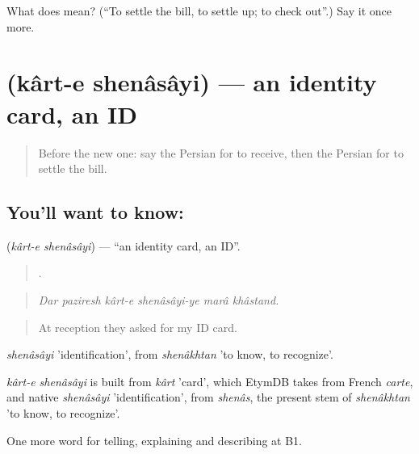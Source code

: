 \begin{tcolorbox}[breakable,colback=teal!4,colframe=teal!35!black,title={Before you move on}]
What does    mean? (\textquotedblleft{}To settle the bill, to settle up; to check out\textquotedblright{}.) Say it once more.
\end{tcolorbox}
\section[\texorpdfstring{\fa{کارت} \fa{شناسایی} (kârt-e shenâsâyi)}{کارت شناسایی (kârt-e shenâsâyi)}]{  (kârt-e shenâsâyi) — an identity card, an ID}

\label{lesson:FA-C438-kart-e-shenasayi}



\begin{quote}
Before the new one: say the Persian for to receive, then the Persian for to settle the bill.
\end{quote}

\subsection*{You'll want to know:  }
\textbf{ } (\emph{kârt-e shenâsâyi}) — \textquotedblleft{}an identity card, an ID\textquotedblright{}.

\begin{quote}
     .
\end{quote}

\begin{quote}
\emph{Dar paziresh kârt-e shenâsâyi-ye marâ khâstand.}
\end{quote}

\begin{quote}
At reception they asked for my ID card.
\end{quote}

\emph{shenâsâyi} 'identification', from \emph{shenâkhtan} 'to know, to recognize'.

\begin{cousinweb}
\emph{kârt-e shenâsâyi} is built from \emph{kârt} 'card', which EtymDB takes from French \emph{carte}, and native \emph{shenâsâyi} 'identification', from \emph{shenâs}, the present stem of \emph{shenâkhtan} 'to know, to recognize'.
\end{cousinweb}

\begin{grammarlens}[title={What you've built}]
One more word for telling, explaining and describing at B1.
\end{grammarlens}

